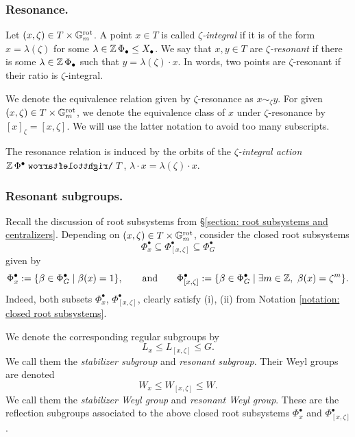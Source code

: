 \subsubsection{Resonance.}\label{subsubsection: resonance}
Let $(x, \zeta) \in T \times \mathbb{G}_m^{\mathrm{rot}}$. 
A point $x \in T$ is called \emph{$\zeta$-integral} if it is of the form $x=\lambda(\zeta)$ for some $\lambda \in \operatorname{\mathbb{Z}}\Phi_{\bullet} \leq X_{\bullet}$. 
We say that $x, y \in T$ are \emph{$\zeta$-resonant} if there is some $\lambda \in \operatorname{\mathbb{Z}}\Phi_{\bullet}$ such that $y = \lambda(\zeta) \cdot x$. In words, two points are $\zeta$-resonant if their ratio is $\zeta$-integral. 

We denote the equivalence relation given by $\zeta$-resonance as $x \sim_{\zeta} y$. For given $(x, \zeta) \in T \times \mathbb{G}_m^{\mathrm{rot}}$, we denote the equivalence class of $x$ under $\zeta$-resonance by $[x]_{\zeta} = [x, \zeta]$. We will use the latter notation to avoid too many subscripts.

The resonance relation is induced by the orbits of the \emph{$\zeta$-integral action} $\Z\Phi^{\bullet} \acts T$, $\lambda \cdot x = \lambda(\zeta) \cdot x$.

\subsubsection{Resonant subgroups.}
Recall the discussion of root subsystems from \S \ref{section: root subsystems and centralizers}.
Depending on $(x, \zeta) \in T \times \mathbb{G}_m^{\mathrm{rot}}$, consider the closed root subsystems
\begin{equation}
    \Phi^{\bullet}_x \subseteq \Phi^{\bullet}_{[x, \zeta]} \subseteq \Phi^{\bullet}_G
\end{equation}
given by
\begin{equation}\label{equation: resonant root system}
    \Phi^{\bullet}_x := \{\beta \in \Phi^{\bullet}_G \mid \beta(x)=1 \},
    \qquad \text{and} \qquad
    \Phi^{\bullet}_{[x, \zeta]} := \{\beta \in \Phi^{\bullet}_G \mid \exists m \in \operatorname{\mathbb{Z}}, \ \beta(x)= \zeta^m \}.
\end{equation}
Indeed, both subsets $\Phi^{\bullet}_x$, $\Phi^{\bullet}_{[x, \zeta]}$, clearly satisfy (i), (ii) from Notation \ref{notation: closed root subsystems}.


We denote the corresponding regular subgroups by
\begin{equation}
L_x \leq L_{[x, \zeta]} \leq G.   
\end{equation}
We call them the \emph{stabilizer subgroup} and \emph{resonant subgroup}.
Their Weyl groups are denoted
\begin{equation}\label{equation: resonant weyl group}
    W_x \leq W_{[x, \zeta]} \leq W.
\end{equation}
We call them the \emph{stabilizer Weyl group} and \emph{resonant Weyl group}.
These are the reflection subgroups associated to the above closed root subsystems $\Phi^{\bullet}_{x}$ and $\Phi^{\bullet}_{[x, \zeta]}$. 


